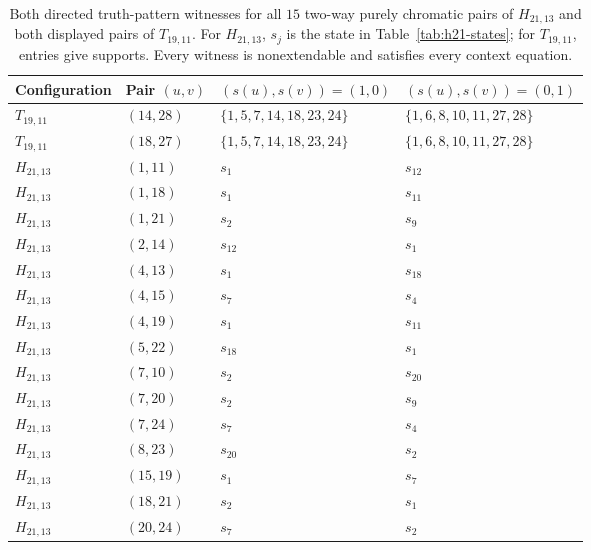 \documentclass[aps,pra,reprint,superscriptaddress,longbibliography,nofootinbib,floatfix,10pt]{revtex4-2}
\theoremstyle{definition}
\begin{document}
\FloatBarrier
\begin{table}[t]\centering\small\setlength{\tabcolsep}{3pt}
\caption{Both directed truth-pattern witnesses for all $15$ two-way purely chromatic pairs of $H_{21,13}$ and both displayed pairs of $T_{19,11}$. For $H_{21,13}$, $s_j$ is the state in Table~\ref{tab:h21-states}; for $T_{19,11}$, entries give supports. Every witness is nonextendable and satisfies every context equation.}\label{tab:pure-witnesses}
\begin{tabular}{p{.14\linewidth}p{.09\linewidth}p{.33\linewidth}p{.33\linewidth}}\toprule
Configuration & Pair $(u,v)$ & $(s(u),s(v))=(1,0)$ & $(s(u),s(v))=(0,1)$\\\midrule
$T_{19,11}$ & $(14,28)$ & $\{1,\allowbreak 5,\allowbreak 7,\allowbreak 14,\allowbreak 18,\allowbreak 23,\allowbreak 24\}$ & $\{1,\allowbreak 6,\allowbreak 8,\allowbreak 10,\allowbreak 11,\allowbreak 27,\allowbreak 28\}$\\
$T_{19,11}$ & $(18,27)$ & $\{1,\allowbreak 5,\allowbreak 7,\allowbreak 14,\allowbreak 18,\allowbreak 23,\allowbreak 24\}$ & $\{1,\allowbreak 6,\allowbreak 8,\allowbreak 10,\allowbreak 11,\allowbreak 27,\allowbreak 28\}$\\
$H_{21,13}$ & $(1,11)$ & $s_{1}$ & $s_{12}$\\
$H_{21,13}$ & $(1,18)$ & $s_{1}$ & $s_{11}$\\
$H_{21,13}$ & $(1,21)$ & $s_{2}$ & $s_{9}$\\
$H_{21,13}$ & $(2,14)$ & $s_{12}$ & $s_{1}$\\
$H_{21,13}$ & $(4,13)$ & $s_{1}$ & $s_{18}$\\
$H_{21,13}$ & $(4,15)$ & $s_{7}$ & $s_{4}$\\
$H_{21,13}$ & $(4,19)$ & $s_{1}$ & $s_{11}$\\
$H_{21,13}$ & $(5,22)$ & $s_{18}$ & $s_{1}$\\
$H_{21,13}$ & $(7,10)$ & $s_{2}$ & $s_{20}$\\
$H_{21,13}$ & $(7,20)$ & $s_{2}$ & $s_{9}$\\
$H_{21,13}$ & $(7,24)$ & $s_{7}$ & $s_{4}$\\
$H_{21,13}$ & $(8,23)$ & $s_{20}$ & $s_{2}$\\
$H_{21,13}$ & $(15,19)$ & $s_{1}$ & $s_{7}$\\
$H_{21,13}$ & $(18,21)$ & $s_{2}$ & $s_{1}$\\
$H_{21,13}$ & $(20,24)$ & $s_{7}$ & $s_{2}$\\
\bottomrule\end{tabular}\end{table}
\end{document}

